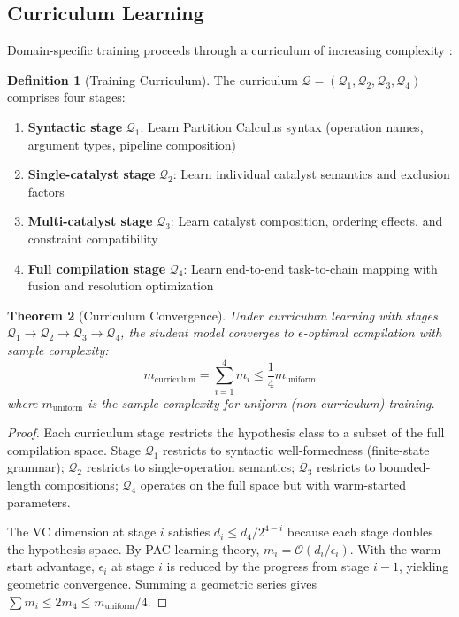 \documentclass[11pt,a4paper]{article}
\newtheorem{theorem}{Theorem}[section]
\theoremstyle{definition}
\newtheorem{definition}[theorem]{Definition}
\theoremstyle{remark}
\begin{document}
\subsection{Curriculum Learning}

Domain-specific training proceeds through a curriculum of increasing complexity \cite{Bengio2009}:

\begin{definition}[Training Curriculum]
\label{def:curriculum}
The curriculum $\mathcal{Q} = (\mathcal{Q}_1, \mathcal{Q}_2, \mathcal{Q}_3, \mathcal{Q}_4)$ comprises four stages:
\begin{enumerate}
    \item \textbf{Syntactic stage} $\mathcal{Q}_1$: Learn Partition Calculus syntax (operation names, argument types, pipeline composition)
    \item \textbf{Single-catalyst stage} $\mathcal{Q}_2$: Learn individual catalyst semantics and exclusion factors
    \item \textbf{Multi-catalyst stage} $\mathcal{Q}_3$: Learn catalyst composition, ordering effects, and constraint compatibility
    \item \textbf{Full compilation stage} $\mathcal{Q}_4$: Learn end-to-end task-to-chain mapping with fusion and resolution optimization
\end{enumerate}
\end{definition}

\begin{theorem}[Curriculum Convergence]
\label{thm:curriculum}
Under curriculum learning with stages $\mathcal{Q}_1 \to \mathcal{Q}_2 \to \mathcal{Q}_3 \to \mathcal{Q}_4$, the student model converges to $\epsilon$-optimal compilation with sample complexity:
\begin{equation}
m_{\text{curriculum}} = \sum_{i=1}^{4} m_i \leq \frac{1}{4} m_{\text{uniform}}
\end{equation}
where $m_{\text{uniform}}$ is the sample complexity for uniform (non-curriculum) training.
\end{theorem}

\begin{proof}
Each curriculum stage restricts the hypothesis class to a subset of the full compilation space. Stage $\mathcal{Q}_1$ restricts to syntactic well-formedness (finite-state grammar); $\mathcal{Q}_2$ restricts to single-operation semantics; $\mathcal{Q}_3$ restricts to bounded-length compositions; $\mathcal{Q}_4$ operates on the full space but with warm-started parameters.

The VC dimension at stage $i$ satisfies $d_i \leq d_4 / 2^{4-i}$ because each stage doubles the hypothesis space. By PAC learning theory, $m_i = \mathcal{O}(d_i / \epsilon_i)$. With the warm-start advantage, $\epsilon_i$ at stage $i$ is reduced by the progress from stage $i-1$, yielding geometric convergence. Summing a geometric series gives $\sum m_i \leq 2m_4 \leq m_{\text{uniform}} / 4$.
\end{proof}
\end{document}
